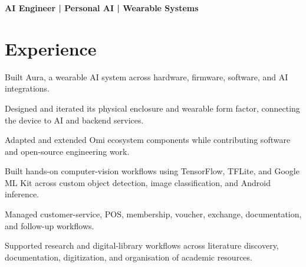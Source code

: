 \documentclass{../../templates/1/resume}
\begin{document}


{\small\bfseries AI Engineer | Personal AI | Wearable Systems}\par\vspace{2pt}

\section{Experience}
\begin{resumeitemize}
\item Built Aura, a wearable AI system across hardware, firmware, software, and AI integrations.
\item Designed and iterated its physical enclosure and wearable form factor, connecting the device to AI and backend services.
\item Adapted and extended Omi ecosystem components while contributing software and open-source engineering work.
\end{resumeitemize}

\begin{resumeitemize}
\item Built hands-on computer-vision workflows using TensorFlow, TFLite, and Google ML Kit across custom object detection, image classification, and Android inference.
\end{resumeitemize}

\begin{resumeitemize}
\item Managed customer-service, POS, membership, voucher, exchange, documentation, and follow-up workflows.
\end{resumeitemize}

\begin{resumeitemize}
\item Supported research and digital-library workflows across literature discovery, documentation, digitization, and organisation of academic resources.
\end{resumeitemize}
\end{document}
